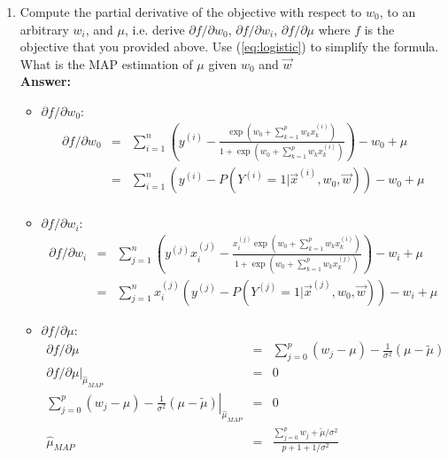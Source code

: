 \documentclass{article}
\begin{document}
\begin{enumerate}
	\item Compute the partial derivative of the objective with respect to $w_0$, to an arbitrary $w_i$, and $\mu$, i.e. derive $\partial f/\partial w_0$, $\partial f/\partial w_i$, $\partial f/\partial \mu$ where $f$ is the objective that you provided above. Use (\ref{eq:logistic}) to simplify the formula. What is the MAP estimation of $\mu$ given $w_0$ and $\vec{w}$
	\\\textbf{Answer:}\\
	\begin{itemize}
		\item $\partial f/\partial w_0$:
		\begin{equation}
		\nonumber
		\begin{array}{rcl}
		\partial f/\partial w_0 & = & \sum_{i=1}^{n}(y^{(i)}-\frac{\exp(w_0+\sum_{k=1}^{p}w_kx_k^{(i)})}{1+\exp(w_0+\sum_{k=1}^{p}w_kx_k^{(i)})}) - w_0 + \mu \\
								& = & \sum_{i=1}^{n}(y^{(i)}-P(Y^{(i)}=1|\vec{x}^{(i)},w_0,\vec{w})) -w_0 + \mu \\
		\end{array}
		\end{equation}
		\item $\partial f/\partial w_i$:
		\begin{equation}
		\nonumber
		\begin{array}{rcl}
		\partial f/\partial w_i & = & \sum_{j=1}^{n}(y^{(j)}x_i^{(j)}-\frac{x_i^{(j)}\exp(w_0+\sum_{k=1}^{p}w_kx_k^{(i)})}{1+\exp(w_0+\sum_{k=1}^{p}w_kx_k^{(j)})}) -w_i + \mu \\
		& = & \sum_{j=1}^{n}x_i^{(j)}(y^{(j)}-P(Y^{(j)}=1|\vec{x}^{(j)},w_0,\vec{w})) -w_i + \mu
		\end{array}
		\end{equation}
		\item $\partial f/\partial \mu$:
		\begin{equation}
		\nonumber
		\begin{array}{rcl}
		\partial f/\partial \mu & = & \sum_{j=0}^{p}(w_j-\mu) - \frac{1}{\sigma^2}(\mu-\tilde{\mu}) \\
		\left. \partial f/\partial \mu \right|_{\hat{\mu}_{MAP}} & = & 0 \\
		\left. \sum_{j=0}^{p}(w_j-\mu) - \frac{1}{\sigma^2}(\mu-\tilde{\mu}) \right|_{\hat{\mu}_{MAP}} & = & 0 \\
		\hat{\mu}_{MAP} & = & \frac{\sum_{j=0}^{p}w_j + \tilde{\mu}/\sigma^2}{p+1+1/\sigma^2}
		\end{array}
		\end{equation}
	\end{itemize}
\end{enumerate}
\end{document}
